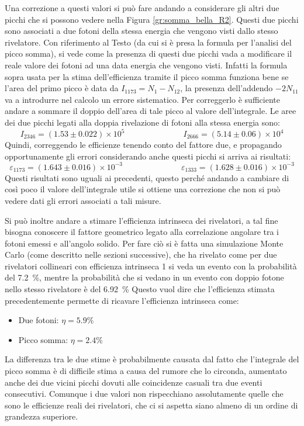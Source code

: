 Una correzione a questi valori si può fare andando a considerare gli altri due picchi che si possono vedere nella Figura \ref{gr:somma_bella_R2}. Questi due picchi sono
associati a due fotoni della stessa energia che vengono visti dallo stesso rivelatore. Con riferimento al Testo \cite{bib:knoll} (da cui si è presa la formula per l'analisi
del picco somma), si vede come la presenza di questi due picchi vada a modificare il reale valore dei fotoni ad una data energia che vengono visti. Infatti la formula
sopra usata per la stima dell'efficienza tramite il picco somma funziona bene se l'area del primo picco è data da $I_{1173}=N_{1}-N_{12}$, la presenza dell'addendo
$-2N_{11}$ va a introdurre nel calcolo un errore sistematico. Per correggerlo è sufficiente andare a sommare il doppio dell'area di tale picco al valore dell'integrale.
Le aree dei due picchi legati alla doppia rivelazione di fotoni alla stessa energia sono:
$$I_{2346} = (1.53\pm 0.022)\times 10^5 \hspace{3cm} I_{2666} = (5.14 \pm 0.06)\times 10^4 $$
Quindi, correggendo le efficienze tenendo conto del fattore due, e propagando opportunamente gli errori considerando anche questi picchi si arriva ai risultati:
$$\varepsilon_{1173}=(1.643 \pm 0.016)\times 10^{-3} \hspace{3cm} \varepsilon_{1333}=(1.628 \pm 0.016)\times 10^{-3}$$
Questi risultati sono uguali ai precedenti, questo perché andando a cambiare di così poco il valore dell'integrale utile si ottiene una correzione che non si può vedere dati
gli errori associati a tali misure.

Si può inoltre andare a stimare l'efficienza intrinseca dei rivelatori, a tal fine bisogna conoscere il fattore geometrico legato alla correlazione angolare tra
i fotoni emessi e all'angolo solido. Per fare ciò si è fatta una simulazione Monte Carlo (come descritto nelle sezioni successive), che ha rivelato come per due
rivelatori collineari con efficienza intrinseca 1 si veda un evento con la probabilità del 7.2~\%, mentre la probabilità che si vedano in un evento con doppio fotone
nello stesso rivelatore è del 6.92~\% Questo vuol dire che l'efficienza stimata precedentemente permette
di ricavare l'efficienza intrinseca come:
\begin{itemize}
\item Due fotoni: $\eta = 5.9\%$
\item Picco somma: $\eta = 2.4\%$
\end{itemize}
La differenza tra le due stime è probabilmente causata dal fatto che l'integrale del picco somma è di difficile stima a causa del rumore che lo circonda, aumentato anche dei due vicini picchi dovuti alle coincidenze casuali tra due eventi consecutivi.
Comunque i due valori non rispecchiano assolutamente quelle che sono le efficienze reali dei rivelatori, che ci si aspetta siano almeno di un ordine di grandezza superiore.

